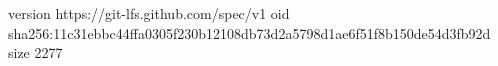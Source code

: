 version https://git-lfs.github.com/spec/v1
oid sha256:11c31ebbc44ffa0305f230b12108db73d2a5798d1ae6f51f8b150de54d3fb92d
size 2277
